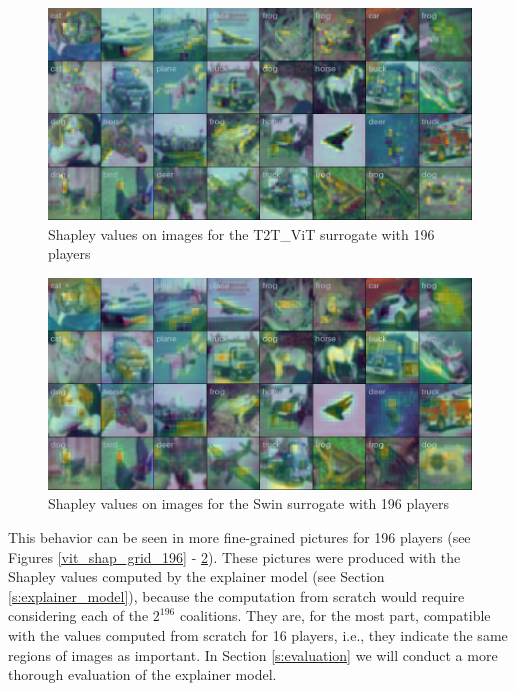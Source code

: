\documentclass[magisterska,en]{pracamgr}
\begin{document}
\begin{figure}[H]
\centering
\includegraphics[scale=0.4]{./images/t2t_vit_shap_grid_196.png}
\caption{Shapley values on images for the T2T\_ViT surrogate with 196 players}
\label{t2t_vit_shap_grid_196}
\end{figure}


\begin{figure}[H]
\centering
\includegraphics[scale=0.4]{./images/swin_shap_grid_196.png}
\caption{Shapley values on images for the Swin surrogate with 196 players}
\label{swin_shap_grid_196}
\end{figure}

\pagebreak


This behavior can be seen in more fine-grained pictures for 196 players (see Figures \ref{vit_shap_grid_196} - \ref{swin_shap_grid_196}). These pictures were produced with the Shapley values computed by the explainer model (see Section \ref{s:explainer_model}), because the computation from scratch would require considering each of the $2^{196}$ coalitions. They are, for the most part, compatible with the values computed from scratch for 16 players, i.e., they indicate the same regions of images as important. In Section \ref{s:evaluation} we will conduct a more thorough evaluation of the explainer model.
\end{document}
